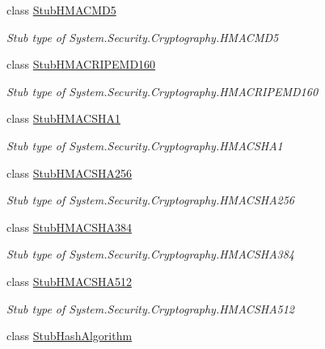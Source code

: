 \begin{DoxyCompactItemize}
class \hyperlink{class_system_1_1_security_1_1_cryptography_1_1_fakes_1_1_stub_h_m_a_c_m_d5}{Stub\-H\-M\-A\-C\-M\-D5}
\begin{DoxyCompactList}\small\item\em Stub type of System.\-Security.\-Cryptography.\-H\-M\-A\-C\-M\-D5\end{DoxyCompactList}\item 
class \hyperlink{class_system_1_1_security_1_1_cryptography_1_1_fakes_1_1_stub_h_m_a_c_r_i_p_e_m_d160}{Stub\-H\-M\-A\-C\-R\-I\-P\-E\-M\-D160}
\begin{DoxyCompactList}\small\item\em Stub type of System.\-Security.\-Cryptography.\-H\-M\-A\-C\-R\-I\-P\-E\-M\-D160\end{DoxyCompactList}\item 
class \hyperlink{class_system_1_1_security_1_1_cryptography_1_1_fakes_1_1_stub_h_m_a_c_s_h_a1}{Stub\-H\-M\-A\-C\-S\-H\-A1}
\begin{DoxyCompactList}\small\item\em Stub type of System.\-Security.\-Cryptography.\-H\-M\-A\-C\-S\-H\-A1\end{DoxyCompactList}\item 
class \hyperlink{class_system_1_1_security_1_1_cryptography_1_1_fakes_1_1_stub_h_m_a_c_s_h_a256}{Stub\-H\-M\-A\-C\-S\-H\-A256}
\begin{DoxyCompactList}\small\item\em Stub type of System.\-Security.\-Cryptography.\-H\-M\-A\-C\-S\-H\-A256\end{DoxyCompactList}\item 
class \hyperlink{class_system_1_1_security_1_1_cryptography_1_1_fakes_1_1_stub_h_m_a_c_s_h_a384}{Stub\-H\-M\-A\-C\-S\-H\-A384}
\begin{DoxyCompactList}\small\item\em Stub type of System.\-Security.\-Cryptography.\-H\-M\-A\-C\-S\-H\-A384\end{DoxyCompactList}\item 
class \hyperlink{class_system_1_1_security_1_1_cryptography_1_1_fakes_1_1_stub_h_m_a_c_s_h_a512}{Stub\-H\-M\-A\-C\-S\-H\-A512}
\begin{DoxyCompactList}\small\item\em Stub type of System.\-Security.\-Cryptography.\-H\-M\-A\-C\-S\-H\-A512\end{DoxyCompactList}\item 
class \hyperlink{class_system_1_1_security_1_1_cryptography_1_1_fakes_1_1_stub_hash_algorithm}{Stub\-Hash\-Algorithm}

\end{DoxyCompactItemize}
